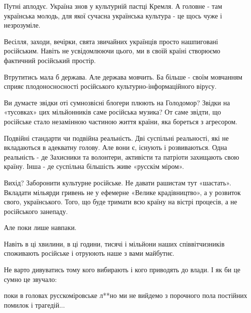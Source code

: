Путні аплодує. Україна знов у культурній пастці Кремля. А головне - там
українська молодь, для якої сучасна українська культура - це щось чуже і
незрозуміле.

Весілля, заходи, вечірки, свята звичайних українців просто нашпиговані
російським. Навіть не усвідомлюючи цього, ми в своїй країні створюємо фактичний
російський простір.

Втрутитись мала б держава. Але держава мовчить. Ба більше - своїм мовчанням
сприяє плодоносносності російського культурно-інформаційного вірусу.

Ви думаєте звідки оті сумнозвісні блогери плюють на Голодомор? Звідки на
«тусовках» цих мільйонників саме російська музика? От саме звідти, що російське
стало незамінною частиною життя країни, яка бореться з агресором. 

Подвійні стандарти чи подвійна реальність. Дві суспільні реальності, які не
вкладаються в адекватну голову. Але вони є, існують і розвиваються. Одна
реальність - де Захисники та волонтери, активісти та патріоти захищають свою
країну. Інша - де суспільна більшість живе «русскім міром». 

Вихід? Заборонити культурне російське. Не давати рашистам тут «шастать».
Вкладати мільярди гривень не у ефемерне «Велике крадівництво», а у розвиток
свого, українського. Того, що буде тримати всю країну на вістрі процесів, а не
російського занепаду. 

Але поки лише навпаки. 

Навіть в ці хвилини, в ці години, тисячі і мільйони наших співвітчизників
споживають російське і отруюють наше з вами майбутнє. 

Не варто дивуватись тому кого вибирають і кого приводять до влади. І як би це
сумно це звучало:

поки в головах русскоміровське л**но ми не вийдемо з порочного пола постійних
помилок і трагедій...

